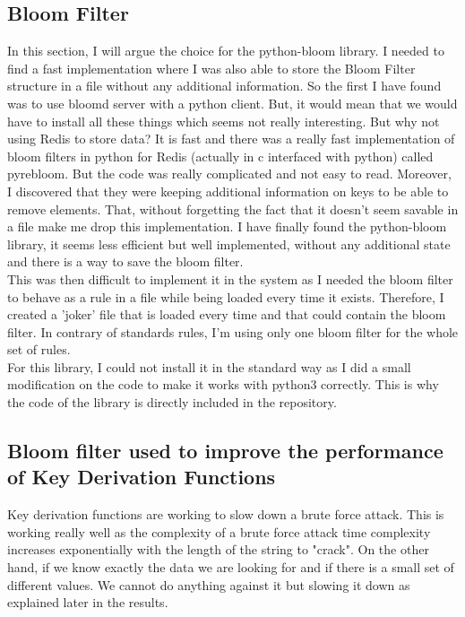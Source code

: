 \documentclass{eplmastersthesis}
\begin{document}
\subsection{Bloom Filter}
In this section, I will argue the choice for the python-bloom library. I needed to find a fast implementation where I was also able to store the Bloom Filter structure in a file without any additional information.
So the first I have found was to use bloomd server with a python client. But, it would mean that we would have to install all these things which seems not really interesting. But why not using Redis to store data? It is fast and there was a really fast implementation of bloom filters in python for Redis (actually in c interfaced with python) called pyrebloom. But the code was really complicated and not easy to read. Moreover, I discovered that they were keeping additional information on keys to be able to remove elements. That, without forgetting the fact that it doesn't seem savable in a file make me drop this implementation.
I have finally found the python-bloom library, it seems less efficient but well implemented, without any additional state and there is a way to save the bloom filter.\\

This was then difficult to implement it in the system as I needed the bloom filter to behave as a rule in a file while being loaded every time it exists. Therefore, I created a 'joker' file that is loaded every time and that could contain the bloom filter.
In contrary of standards rules, I'm using only one bloom filter for the whole set of rules.\\

For this library, I could not install it in the standard way as I did a small modification on the code to make it works with python3 correctly. This is why the code of the library is directly included in the repository.


\subsection{Bloom filter used to improve the performance of Key Derivation Functions}
Key derivation functions are working to slow down a brute force attack. This is working really well as the complexity of a brute force attack time complexity increases exponentially with the length of the string to "crack". On the other hand, if we know exactly the data we are looking for and if there is a small set of different values. We cannot do anything against it but slowing it down as explained later in the results. \\
\end{document}
